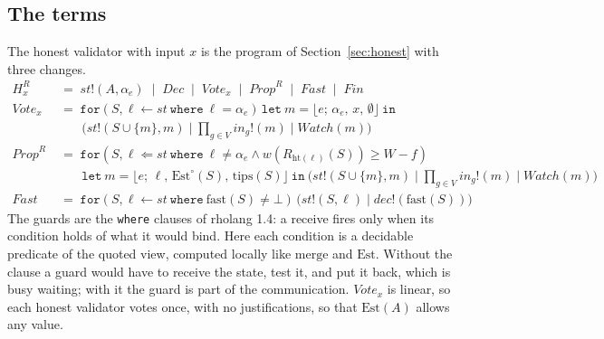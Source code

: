 \documentclass[11pt]{article}
\theoremstyle{definition}
\theoremstyle{remark}
\newcommand{\snd}[2]{#1!(#2)}
\newcommand{\blk}[4]{\lfloor #1;\, #2,\, #3,\, #4\rfloor}
\newcommand{\Est}{\mathrm{Est}}
\newcommand{\merge}{\mathrm{merge}}
\newcommand{\tips}{\mathrm{tips}}
\newcommand{\hgt}{\mathrm{ht}}
\begin{document}
\subsection{The terms}

The honest validator with input $x$ is the program of
Section~\ref{sec:honest} with three changes.
\begin{align*}
H^{R}_x &\;=\; \snd{\mathit{st}}{A,\alpha_e}\;\mid\;\mathit{Dec}\;\mid\;
  \mathit{Vote}_x\;\mid\;\mathit{Prop}^R\;\mid\;\mathit{Fast}\;\mid\;\mathit{Fin}\\
\mathit{Vote}_x &\;=\; \mathtt{for}(S,\ell \leftarrow \mathit{st}
  \ \mathtt{where}\ \ell=\alpha_e)\,
  \mathtt{let}\ m=\blk{e}{\alpha_e}{x}{\emptyset}\ \mathtt{in}\\
  &\qquad\bigl(\snd{\mathit{st}}{S\cup\{m\},m}\mid\textstyle\prod_{g\in V}
  \snd{\mathit{in}_g}{m}\mid\mathit{Watch}(m)\bigr)\\
\mathit{Prop}^R &\;=\; \mathtt{for}(S,\ell \Leftarrow \mathit{st}
  \ \mathtt{where}\ \ell\ne\alpha_e \wedge
  w(R_{\hgt(\ell)}(S))\ge W-f)\,\\
  &\qquad\mathtt{let}\ m=\blk{e}{\ell}{\Est^{\circ}(S)}{\tips(S)}\ \mathtt{in}\
  \bigl(\snd{\mathit{st}}{S\cup\{m\},m}\mid\textstyle\prod_{g\in V}
  \snd{\mathit{in}_g}{m}\mid\mathit{Watch}(m)\bigr)\\
\mathit{Fast} &\;=\; \mathtt{for}(S,\ell \leftarrow \mathit{st}
  \ \mathtt{where}\ \mathrm{fast}(S)\ne\bot)\,
  \bigl(\snd{\mathit{st}}{S,\ell}\mid\snd{\mathit{dec}}{\mathrm{fast}(S)}\bigr)
\end{align*}
The guards are the \texttt{where} clauses of rholang 1.4: a receive fires only
when its condition holds of what it would bind. Here each condition is a
decidable predicate of the quoted view, computed locally like $\merge$ and
$\Est$. Without the clause a guard would have to receive the state, test it,
and put it back, which is busy waiting; with it the guard is part of the
communication. $\mathit{Vote}_x$ is linear, so each honest validator votes
once, with no justifications, so that $\Est(A)$ allows any value.
\end{document}
